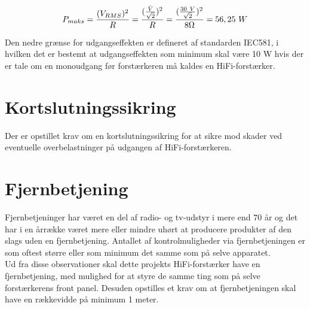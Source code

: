 \begin{equation}
\label{equ:maks_effekt}
P_{maks} = \frac{(V_{RMS})^2}{R}= \frac{(\frac{\hat{V}}{\sqrt{2}})^2}{R} = \frac{(\frac{30~V}{\sqrt{2}})^2}{8\ohm} = 56,25~W
\end{equation}

Den nedre grænse for udgangseffekten er defineret af standarden IEC581, i hvilken det er bestemt at udgangseffekten som minimum skal være 10 W hvis der er tale om en monoudgang før forstærkeren må kaldes en HiFi-forstærker.

\section{Kortslutningssikring}
\label{krav_kortslutningssikring}
Der er opstillet krav om en kortslutningssikring for at sikre mod skader ved eventuelle overbelastninger på udgangen af HiFi-forstærkeren.

\section{Fjernbetjening}
\label{krav_fjernbetjening}
Fjernbetjeninger har været en del af radio- og tv-udstyr i mere end 70 år og det har i en årrække været mere eller mindre uhørt at producere produkter af den slags uden en fjernbetjening. Antallet af kontrolmuligheder via fjernbetjeningen er som oftest større eller som minimum det samme som på selve apparatet.\\
Ud fra disse observationer skal dette projekts HiFi-forstærker have en fjernbetjening, med mulighed for at styre de samme ting som på selve forstærkerens front panel. Desuden opstilles et krav om at fjernbetjeningen skal have en rækkevidde på minimum 1 meter.